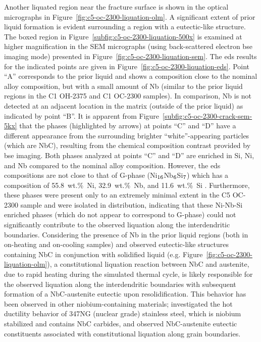 {Another liquated region near the fracture surface is shown in the optical micrographs in Figure~\ref{fig:c5-oc-2300-liquation-olm}. A significant extent of prior liquid formation is evident surrounding a region with a eutectic-like structure. The boxed region in Figure~\ref{subfig:c5-oc-2300-liquation-500x} is examined at higher magnification in the SEM micrographs (using back-scattered electron \gls{bse} imaging mode) presented in Figure~\ref{fig:c5-oc-2300-liquation-sem}. The \gls{eds} results for the indicated points are given in Figure~\ref{fig:c5-oc-2300-liquation-eds}. Point ``A'' corresponds to the prior liquid and shows a composition close to the nominal alloy composition, but with a small amount of Nb (similar to the prior liquid regions in the C1 OH-2375 and C1 OC-2300 samples). In comparison, Nb is not detected at an adjacent location in the matrix (outside of the prior liquid) as indicated by point ``B''. It is apparent from Figure~\ref{subfig:c5-oc-2300-crack-sem-5kx} that the phases (highlighted by arrows) at points ``C'' and ``D'' have a different appearance from the surrounding brighter ``white''-appearing particles (which are NbC), resulting from the chemical composition contrast provided by \gls{bse} imaging. Both phases analyzed at points ``C'' and ``D'' are enriched in Si, Ni, and Nb compared to the nominal alloy composition. However, the \gls{eds} compositions are not close to that of G-phase (Ni$_\textnormal{16}$Nb$_\textnormal{6}$Si$_\textnormal{7}$) which has a composition of 55.8~wt.\%~Ni, 32.9~wt.\%~Nb, and 11.6~wt.\%~Si \cite{hoffman_high_2000-1}. Furthermore, these phases were present only to an extremely minimal extent in the C5 OC-2300 sample and were isolated in distribution, indicating that these Ni-Nb-Si enriched phases (which do not appear to correspond to G-phase) could not significantly contribute to the observed liquation along the interdendritic boundaries. Considering the presence of Nb in the prior liquid regions (both in on-heating and on-cooling samples) and observed eutectic-like structures containing NbC in conjunction with solidified liquid (e.g. Figure~\ref{fig:c5-oc-2300-liquation-olm}), a constitutional liquation reaction between NbC and austenite, due to rapid heating during the simulated thermal cycle, is likely responsible for the observed liquation along the interdendritic boundaries with subsequent formation of a NbC-austenite eutectic upon resolidification. This behavior has been observed in other niobium-containing materials; \citet{lee_weldability_1988} investigated the hot ductility behavior of 347NG (nuclear grade) stainless steel, which is niobium stabilized and contains NbC carbides, and observed NbC-austenite eutectic constituents associated with constitutional liquation along grain boundaries.

}

